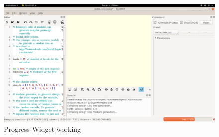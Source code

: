 \begin{figure}[H]
	\centering
	\includegraphics[width=\linewidth]{images/output/progress_widget.png}
	\caption{Progress Widget working}
\end{figure}

